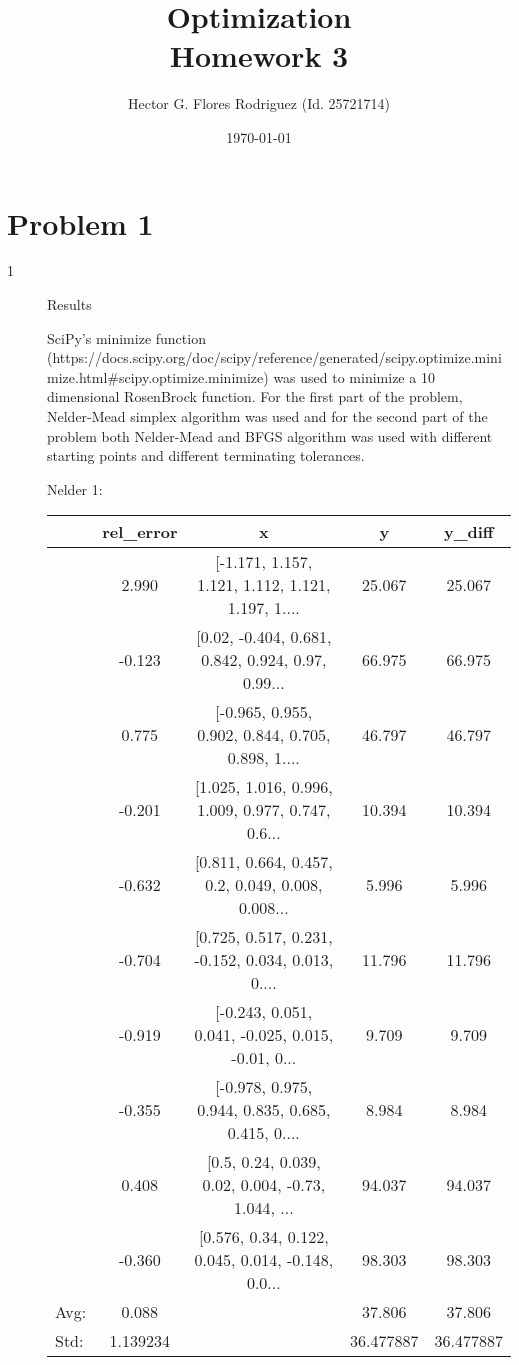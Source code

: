\documentclass[10pt,onside]{article}
\title{\blue Optimization \\
\blueb Homework 3}
\author{Hector G. Flores Rodriguez (Id. 25721714)}
\date{\today} %
\begin{document}
\maketitle

\section{Problem 1}
\begin{description}
\item[1] Results

SciPy's minimize function (https://docs.scipy.org/doc/scipy/reference/generated/scipy.optimize.minimize.html#scipy.optimize.minimize) was used to minimize a 10 dimensional RosenBrock function. For the first part of the problem, Nelder-Mead simplex algorithm was used and for the second part of the problem both Nelder-Mead and BFGS algorithm was used with different starting points and different terminating tolerances.

Nelder 1:

\begin{tabular}{lcccc}
\toprule
{} &  rel\_error &                                                  x &       y &  y\_diff \\
\midrule
&      2.990 &  [-1.171, 1.157, 1.121, 1.112, 1.121, 1.197, 1.... &  25.067 &  25.067 \\
&     -0.123 &  [0.02, -0.404, 0.681, 0.842, 0.924, 0.97, 0.99... &  66.975 &  66.975 \\
&      0.775 &  [-0.965, 0.955, 0.902, 0.844, 0.705, 0.898, 1.... &  46.797 &  46.797 \\
&     -0.201 &  [1.025, 1.016, 0.996, 1.009, 0.977, 0.747, 0.6... &  10.394 &  10.394 \\
&     -0.632 &  [0.811, 0.664, 0.457, 0.2, 0.049, 0.008, 0.008... &   5.996 &   5.996 \\
&     -0.704 &  [0.725, 0.517, 0.231, -0.152, 0.034, 0.013, 0.... &  11.796 &  11.796 \\
&     -0.919 &  [-0.243, 0.051, 0.041, -0.025, 0.015, -0.01, 0... &   9.709 &   9.709 \\
&     -0.355 &  [-0.978, 0.975, 0.944, 0.835, 0.685, 0.415, 0.... &   8.984 &   8.984 \\
&      0.408 &  [0.5, 0.24, 0.039, 0.02, 0.004, -0.73, 1.044, ... &  94.037 &  94.037 \\
&     -0.360 &  [0.576, 0.34, 0.122, 0.045, 0.014, -0.148, 0.0... &  98.303 &  98.303 \\
\bottomrule
Avg: & 0.088 &  & 37.806 & 37.806 \\
Std: & 1.139234 &  & 36.477887 & 36.477887 \\
\bottomrule
\end{tabular}


\end{description}
\end{document}
